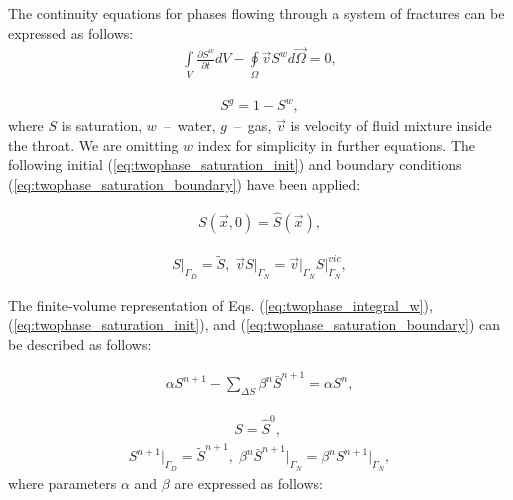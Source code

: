 \documentclass[a4paper,12pt]{extreport}
\begin{document}
  The continuity equations for phases flowing through a system of fractures can be expressed as follows:
  \begin{eqnarray}
  \label{eq:twophase_integral_w}
  \int \limits_{V} \frac{\partial S^w}{\partial t} d V - \oint \limits_{\Omega} \vec{v}S^w d\vec{\Omega} = 0,
  \end{eqnarray}
  
  \begin{eqnarray}
  \label{eq:twophase_gas_phase}
  S^g = 1 - S^w,
  \end{eqnarray}
  where  $S$ is saturation, $w$~--~water, $g$~--~gas, $\vec{v}$ is velocity of fluid mixture inside the throat. We are omitting $w$ index for simplicity in further equations.
 \newpage
The following initial (\ref{eq:twophase_saturation_init}) and boundary conditions (\ref{eq:twophase_saturation_boundary}) have been applied:
  
  \begin{eqnarray}
  \label{eq:twophase_saturation_init}
  S \left(\vec{x}, \mathit{0}\right) = \hat{S} \left(\vec{x}\right),
  \end{eqnarray}
  
  \begin{eqnarray}
  \label{eq:twophase_saturation_boundary}
  S \Big|_{\mathit{\Gamma}_D} \!\!= \tilde{S}, \; \vec{v}S \Big|_{\mathit{\Gamma}_N} \!\!= \vec{v}\Big|_{\mathit{\Gamma}_N}S \Big|^{vic}_{\mathit{\Gamma}_N},
  \end{eqnarray}
  
  The finite-volume representation of Eqs. (\ref{eq:twophase_integral_w}), (\ref{eq:twophase_saturation_init}), and (\ref{eq:twophase_saturation_boundary}) can be described as follows:
  
   \begin{eqnarray}
  \label{eq:twophase_num}
  \alpha S^{n+\mathit{1}} -  \sum_{\Delta S} \beta^n\bar{S}^{n+1} =   \alpha S^{n},
  \end{eqnarray}
  
  \begin{eqnarray}
  \label{eq:twophase_num_init}
  S = \hat{S}^{\mathit{0}}, \; 
  \end{eqnarray}
  \begin{eqnarray}
  \label{eq:twophase_num_bound}
  S^{n+\mathit 1}  \Big|_{\mathit{\Gamma}_D}= \tilde{S}^{n+\mathit 1}, \; \beta^n \bar{S}^{n+\mathit 1} \Big|_{\mathit{\Gamma}_N} \!\!= \beta^n S^{n+\mathit 1} \Big|_{\mathit{\Gamma}_N},
  \end{eqnarray}
  where parameters $\alpha$ and $\beta$ are expressed as follows:
  
\end{document}
